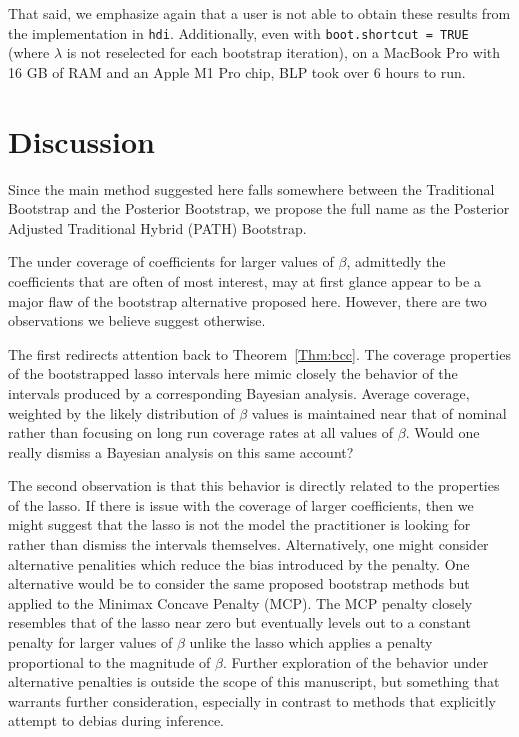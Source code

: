 That said, we emphasize again that a user is not able to obtain these results from the implementation in \texttt{hdi}. Additionally, even with \texttt{boot.shortcut = TRUE} (where $\lambda$ is not reselected for each bootstrap iteration), on a MacBook Pro with 16 GB of RAM and an Apple M1 Pro chip, BLP took over 6 hours to run. 

\section{Discussion}

Since the main method suggested here falls somewhere between the Traditional Bootstrap and the Posterior Bootstrap, we propose the full name as the Posterior Adjusted Traditional Hybrid (PATH) Bootstrap.

The under coverage of coefficients for larger values of $\beta$, admittedly the coefficients that are often of most interest, may at first glance appear to be a major flaw of the bootstrap alternative proposed here. However, there are two observations we believe suggest otherwise. 

The first redirects attention back to Theorem~\ref{Thm:bcc}. The coverage properties of the bootstrapped lasso intervals here mimic closely the behavior of the intervals produced by a corresponding Bayesian analysis. Average coverage, weighted by the likely distribution of $\beta$ values is maintained near that of nominal rather than focusing on long run coverage rates at all values of $\beta$. Would one really dismiss a Bayesian analysis on this same account? 

The second observation is that this behavior is directly related to the properties of the lasso. If there is issue with the coverage of larger coefficients, then we might suggest that the lasso is not the model the practitioner is looking for rather than dismiss the intervals themselves. Alternatively, one might consider alternative penalities which reduce the bias introduced by the penalty. One alternative would be to consider the same proposed bootstrap methods but applied to the Minimax Concave Penalty (MCP). The MCP penalty closely resembles that of the lasso near zero but eventually levels out to a constant penalty for larger values of $\beta$ unlike the lasso which applies a penalty proportional to the magnitude of $\beta$. Further exploration of the behavior under alternative penalties is outside the scope of this manuscript, but something that warrants further consideration, especially in contrast to methods that explicitly attempt to debias during inference.

